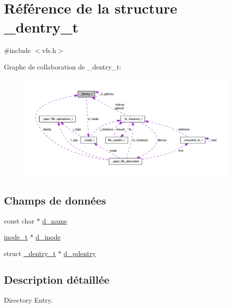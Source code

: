 \hypertarget{struct__dentry__t}{\section{Référence de la structure \-\_\-dentry\-\_\-t}
\label{struct__dentry__t}
}


{\ttfamily \#include $<$vfs.\-h$>$}



Graphe de collaboration de \-\_\-dentry\-\_\-t\-:\nopagebreak
\begin{figure}[H]
\begin{center}
\leavevmode
\includegraphics[width=350pt]{struct__dentry__t__coll__graph}
\end{center}
\end{figure}
\subsection*{Champs de données}
\begin{DoxyCompactItemize}
\item 
const char $\ast$ \hyperlink{struct__dentry__t_ac9b991f6f5d5c5ce60e8d256d667265e}{d\-\_\-name}
\item 
\hyperlink{vfs_8h_af51b41660b60ad79b490887fe6e22da9}{inode\-\_\-t} $\ast$ \hyperlink{struct__dentry__t_ac711731a0c08b35b5d2731b8545c7454}{d\-\_\-inode}
\item 
struct \hyperlink{struct__dentry__t}{\-\_\-dentry\-\_\-t} $\ast$ \hyperlink{struct__dentry__t_a900178add855a65bb2c42a1fbb94686b}{d\-\_\-pdentry}
\end{DoxyCompactItemize}


\subsection{Description détaillée}
Directory Entry. 


